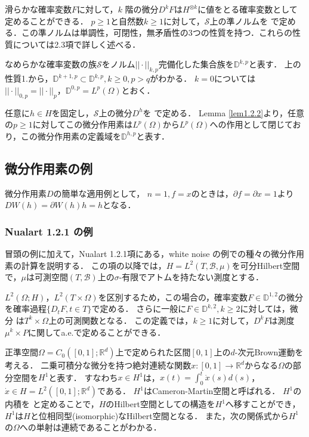 滑らかな確率変数$F$に対して，$k$ 階の微分$D^kF$は$H^{\otimes k}$に値をとる確率変数として定めることができる．
$p\ge1$と自然数$k\ge1$に対して，$\mathcal{S}$上の準ノルムを
で定める．この準ノルムは単調性，可閉性，無矛盾性の$3$つの性質を持つ．これらの性質については2.3項で詳しく述べる．

なめらかな確率変数の族$\mathcal{S}$をノルム$||\cdot||_{k,p}$完備化した集合族を$\mathbb{D}^{k,p}$と表す．
上の性質1.から，$\mathbb{D}^{k+1,p}\subset\mathbb{D}^{k,p},k\ge0,p>q$がわかる．
$k=0$については$||\cdot||_{0,p}=||\cdot||_p$，$\mathbb{D}^{0,p}=L^p(\Omega)$とおく．

任意に$h\in H$を固定し，$\mathcal{S}$上の微分$D^h$を
で定める．
Lemma \ref{lem1.2.2}より，任意の$p\ge1$に対してこの微分作用素は$L^p(\Omega)$から$L^p(\Omega)$への作用として閉じており，この微分作用素の定義域を$\mathbb{D}^{h,p}$と表す．

\subsection{微分作用素の例}
微分作用素$D$の簡単な適用例として，
$n=1,f=x$のときは，$\partial f=\partial x=1$より$DW(h)=\partial W(h)h=h$となる．

\subsubsection{Nualart \cite{Nualart2006} 1.2.1 の例}
冒頭の例に加えて，Nualart\cite{Nualart2006} 1.2.1項にある，white noise の例での種々の微分作用素の計算を説明する．
この項の以降では，$H=L^2(T,\mathcal{B},\mu)$を可分Hilbert空間で，$\mu$は可測空間$(T,\mathcal{B})$上の$\sigma$-有限でアトムを持たない測度とする．

$L^2(\Omega ;H)$，$L^2(T\times\Omega)$を区別するため，この場合の，確率変数$F\in\mathbb{D}^{1,2}$の微分を確率過程$\{D_tF,t\in T\}$で定める．
さらに一般に$F\in\mathbb{D}^{k,2},k\ge 2$に対しては，微分
は$T^k\times\Omega$上の可測関数となる．
この定義では，$k\ge1$に対して，$D^kF$は測度$\mu^k\times P$に関してa.e.で定めることができる．

正準空間$\Omega=C_0([0,1];\mathbb{R}^d)$上で定められた区間$[0,1]$上の$d$-次元Brown運動を考える．
二乗可積分な微分を持つ絶対連続な関数$x:[0,1]\rightarrow\mathbb{R}^d$からなる$\Omega$の部分空間を$H^1$と表す．
すなわち$x\in H^1$は，$x(t)=\int_0^t\dot{x}(s)d(s)$，$\dot{x}\in H=L^2([0,1];\mathbb{R}^d)$である．
$H^1$はCameron-Martin空間と呼ばれる．
$H^1$の内積を
と定めることで，$H$のHilbert空間としての構造を$H^1$へ移すことができ，$H^1$は$H$と位相同型(isomorphic)なHilbert空間となる．
また，次の関係式から$H^1$の$\Omega$への単射は連続であることがわかる．

